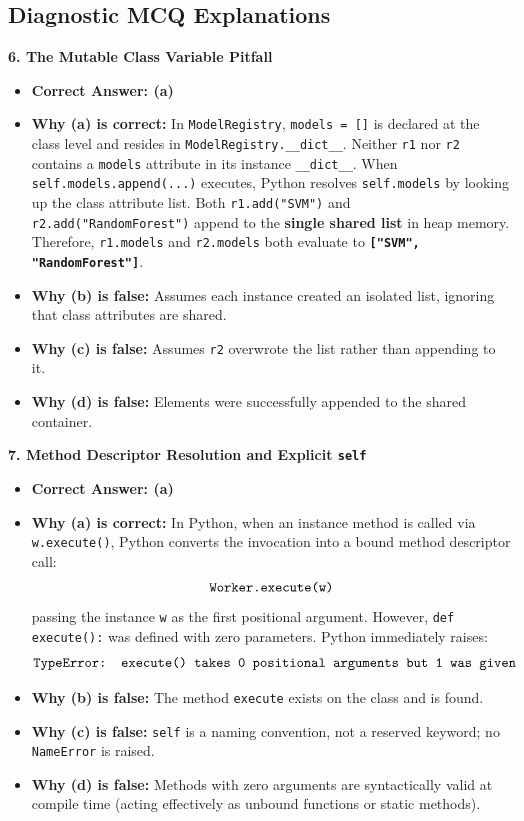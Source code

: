 \subsection*{Diagnostic MCQ Explanations}

\textbf{6. The Mutable Class Variable Pitfall}
\begin{itemize}
    \item \textbf{Correct Answer: (a)}
    \item \textbf{Why (a) is correct:}
    In \texttt{ModelRegistry}, \texttt{models = []} is declared at the class level and resides in \texttt{ModelRegistry.\_\_dict\_\_}.
    Neither \texttt{r1} nor \texttt{r2} contains a \texttt{models} attribute in its instance \texttt{\_\_dict\_\_}.
    When \texttt{self.models.append(...)} executes, Python resolves \texttt{self.models} by looking up the class attribute list.
    Both \texttt{r1.add("SVM")} and \texttt{r2.add("RandomForest")} append to the \textbf{single shared list} in heap memory.
    Therefore, \texttt{r1.models} and \texttt{r2.models} both evaluate to \textbf{\texttt{["SVM", "RandomForest"]}}.
    \item \textbf{Why (b) is false:} Assumes each instance created an isolated list, ignoring that class attributes are shared.
    \item \textbf{Why (c) is false:} Assumes \texttt{r2} overwrote the list rather than appending to it.
    \item \textbf{Why (d) is false:} Elements were successfully appended to the shared container.
\end{itemize}

\textbf{7. Method Descriptor Resolution and Explicit \texttt{self}}
\begin{itemize}
    \item \textbf{Correct Answer: (a)}
    \item \textbf{Why (a) is correct:}
    In Python, when an instance method is called via \texttt{w.execute()}, Python converts the invocation into a bound method descriptor call:
    \begin{equation*}
    \text{\texttt{Worker.execute(w)}}
    \end{equation*}
    passing the instance \texttt{w} as the first positional argument.
    However, \texttt{def execute():} was defined with zero parameters.
    Python immediately raises:
    \begin{equation*}
    \text{\texttt{TypeError: execute() takes 0 positional arguments but 1 was given}}
    \end{equation*}
    \item \textbf{Why (b) is false:} The method \texttt{execute} exists on the class and is found.
    \item \textbf{Why (c) is false:} \texttt{self} is a naming convention, not a reserved keyword; no \texttt{NameError} is raised.
    \item \textbf{Why (d) is false:} Methods with zero arguments are syntactically valid at compile time (acting effectively as unbound functions or static methods).
\end{itemize}

